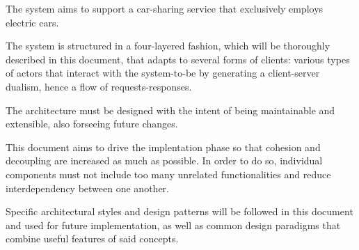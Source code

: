 The system aims to support a car-sharing service that exclusively employs electric cars.

The system is structured in a four-layered fashion, which will be thoroughly described in this document, that adapts to several forms of clients: various types of actors that interact with the system-to-be by generating a client-server dualism, hence a flow of requests-responses.

The architecture must be designed with the intent of being maintainable and extensible, also forseeing future changes.

This document aims to drive the implentation phase so that cohesion and decoupling are increased as much as possible. In order to do so, individual components must not include too many unrelated functionalities and reduce interdependency between one another.

Specific architectural styles and design patterns will be followed in this document and used for future implementation, as well as common design paradigms that combine useful features of said concepts.